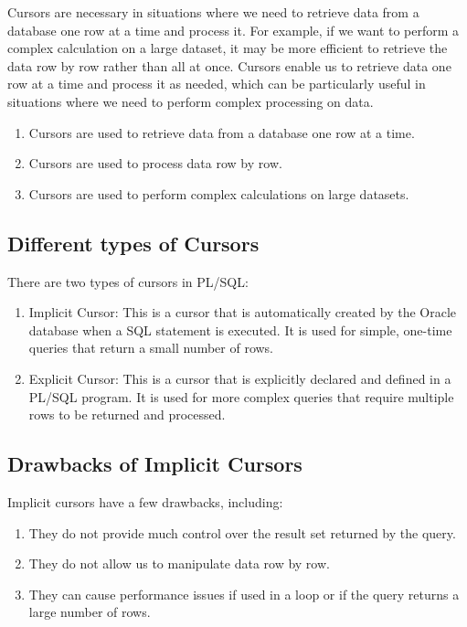 \documentclass[11pt]{article}
\begin{document}
Cursors are necessary in situations where we need to retrieve data from a database one row at a time and process it. For example, if we want to perform a complex calculation on a large dataset, it may be more efficient to retrieve the data row by row rather than all at once. Cursors enable us to retrieve data one row at a time and process it as needed, which can be particularly useful in situations where we need to perform complex processing on data.

\begin{enumerate}
    \item Cursors are used to retrieve data from a database one row at a time.
    \item  Cursors are used to process data row by row.
    \item  Cursors are used to perform complex calculations on large datasets.
\end{enumerate}

\subsection{Different types of Cursors}

There are two types of cursors in PL/SQL:

\begin{enumerate}
    \item Implicit Cursor: This is a cursor that is automatically created by the Oracle database when a SQL statement is executed. It is used for simple, one-time queries that return a small number of rows.
    \item Explicit Cursor: This is a cursor that is explicitly declared and defined in a PL/SQL program. It is used for more complex queries that require multiple rows to be returned and processed.
\end{enumerate}

\subsection{Drawbacks of Implicit Cursors}

Implicit cursors have a few drawbacks, including:

\begin{enumerate}
    \item They do not provide much control over the result set returned by the query.
    \item They do not allow us to manipulate data row by row.
    \item They can cause performance issues if used in a loop or if the query returns a large number of rows.
\end{enumerate}
\end{document}
